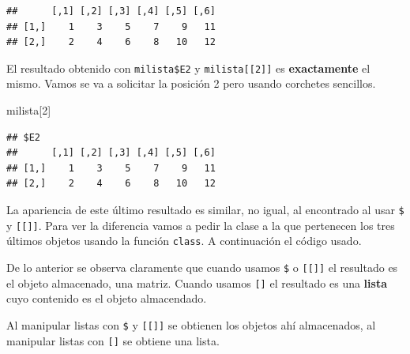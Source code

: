 \documentclass[
]{book}
\makeatletter
\newenvironment{Shaded}{\begin{snugshade}}{\end{snugshade}}
\newcommand{\DecValTok}[1]{\textcolor[rgb]{0.00,0.00,0.81}{#1}}
\newcommand{\DocumentationTok}[1]{\textcolor[rgb]{0.56,0.35,0.01}{\textbf{\textit{#1}}}}
\newcommand{\FunctionTok}[1]{\textcolor[rgb]{0.00,0.00,0.00}{#1}}
\newcommand{\NormalTok}[1]{#1}
\newcommand{\SpecialCharTok}[1]{\textcolor[rgb]{0.00,0.00,0.00}{#1}}
\newenvironment{kframe}{%
\medskip{}
\setlength{\fboxsep}{.8em}
 \def\at@end@of@kframe{}%
 \ifinner\ifhmode%
  \def\at@end@of@kframe{\end{minipage}}%
  \begin{minipage}{\columnwidth}%
 \fi\fi%
 \def\FrameCommand##1{\hskip\@totalleftmargin \hskip-\fboxsep
 \colorbox{shadecolor}{##1}\hskip-\fboxsep
     \hskip-\linewidth \hskip-\@totalleftmargin \hskip\columnwidth}%
 \MakeFramed {\advance\hsize-\width
   \@totalleftmargin\z@ \linewidth\hsize
   \@setminipage}}%
 {\par\unskip\endMakeFramed%
 \at@end@of@kframe}
\newenvironment{rmdblock}[1]
  {
  \begin{itemize}
  \renewcommand{\labelitemi}{
    \raisebox{-.7\height}[0pt][0pt]{
      {\setkeys{Gin}{width=3em,keepaspectratio}\texttt{[image: images/\#1]}}
    }
  }
  \setlength{\fboxsep}{1em}
  \begin{kframe}
  \item
  }
  {
  \end{kframe}
  \end{itemize}
  }
\newenvironment{rmdwarning}
  {\begin{rmdblock}{warning}}
  {\end{rmdblock}}
\makeatother
\begin{document}
\begin{verbatim}
##      [,1] [,2] [,3] [,4] [,5] [,6]
## [1,]    1    3    5    7    9   11
## [2,]    2    4    6    8   10   12
\end{verbatim}

El resultado obtenido con \texttt{milista\$E2} y \texttt{milista{[}{[}2{]}{]}} es \textbf{exactamente} el mismo. Vamos se va a solicitar la posición 2 pero usando corchetes sencillos.

\begin{Shaded}
\begin{Highlighting}[]
\NormalTok{milista[}\DecValTok{2}\NormalTok{]}
\end{Highlighting}
\end{Shaded}

\begin{verbatim}
## $E2
##      [,1] [,2] [,3] [,4] [,5] [,6]
## [1,]    1    3    5    7    9   11
## [2,]    2    4    6    8   10   12
\end{verbatim}

La apariencia de este último resultado es similar, no igual, al encontrado al usar \texttt{\$} y \texttt{{[}{[}{]}{]}}. Para ver la diferencia vamos a pedir la clase a la que pertenecen los tres últimos objetos usando la función \texttt{class}. A continuación el código usado.

\begin{Shaded}
\end{Shaded}

De lo anterior se observa claramente que cuando usamos \texttt{\$} o \texttt{{[}{[}{]}{]}} el resultado es el objeto almacenado, una matriz. Cuando usamos \texttt{{[}{]}} el resultado es una \textbf{lista} cuyo contenido es el objeto almacendado.

\begin{rmdwarning}
Al manipular listas con \texttt{\$} y \texttt{{[}{[}{]}{]}} se obtienen los objetos ahí almacenados, al manipular listas con \texttt{{[}{]}} se obtiene una lista.
\end{rmdwarning}
\end{document}
